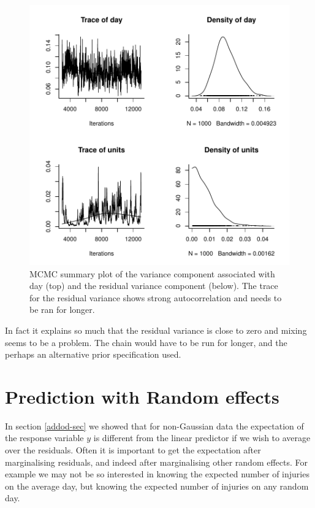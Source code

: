 \documentclass{article}
\begin{document}
\begin{figure}[!h]
\begin{center}
\includegraphics{Lecture2-055}
\end{center}
\caption{MCMC summary plot of the variance component associated with day (top) and the residual variance component (below). The trace for the residual variance shows strong autocorrelation and needs to be ran for longer.}
\label{GLMM.VCV-fig}
\end{figure}

In fact it explains so much that the residual variance is close to zero and mixing seems to be a problem. The chain would have to be run for longer, and the perhaps an alternative prior specification used.

\section{Prediction with Random effects}
\label{pred-sec}

In section \ref{addod-sec} we showed that for non-Gaussian data the expectation of the response variable $y$ is different from the linear predictor if we wish to average over the residuals. Often it is important to get the expectation after marginalising residuals, and indeed after marginalising other random effects. For example we may not be so interested in knowing the expected number of injuries on the average day, but knowing the expected number of injuries on any random day. \\  
\end{document}
